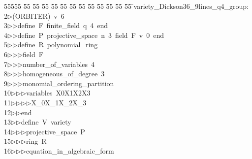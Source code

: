 %
%
\begin{tabbing}
55555 \= 55 \= 55 \= 55 \= 55 \= 55 \= 55 \= 55 \= 55 \= 55 \= 55 \= 55 \= 55 \= \>variety\_Dickson36\_9lines\_q4\_group:\\[0pt]
2\>$\triangleright$\>(ORBITER)\ v\ 6\ \\[0pt]
3\>$\triangleright$\>$\triangleright$\>define\ F\ finite\_field\ q\ 4\ end\ \\[0pt]
4\>$\triangleright$\>$\triangleright$\>define\ P\ projective\_space\ n\ 3\ field\ F\ v\ 0\ end\ \\[0pt]
5\>$\triangleright$\>$\triangleright$\>define\ R\ polynomial\_ring\ \\[0pt]
6\>$\triangleright$\>$\triangleright$\>$\triangleright$\>field\ F\ \\[0pt]
7\>$\triangleright$\>$\triangleright$\>$\triangleright$\>number\_of\_variables\ 4\ \\[0pt]
8\>$\triangleright$\>$\triangleright$\>$\triangleright$\>homogeneous\_of\_degree\ 3\ \\[0pt]
9\>$\triangleright$\>$\triangleright$\>$\triangleright$\>monomial\_ordering\_partition\ \\[0pt]
10\>$\triangleright$\>$\triangleright$\>$\triangleright$\>variables\ X0X1X2X3\ \\[0pt]
11\>$\triangleright$\>$\triangleright$\>$\triangleright$\>$\triangleright$\>X\_0X\_1X\_2X\_3\ \\[0pt]
12\>$\triangleright$\>$\triangleright$\>end\ \\[0pt]
13\>$\triangleright$\>$\triangleright$\>define\ V\ variety\ \\[0pt]
14\>$\triangleright$\>$\triangleright$\>$\triangleright$\>projective\_space\ P\ \\[0pt]
15\>$\triangleright$\>$\triangleright$\>$\triangleright$\>ring\ R\ \\[0pt]
16\>$\triangleright$\>$\triangleright$\>$\triangleright$\>equation\_in\_algebraic\_form\ \\[0pt]

\end{tabbing}
